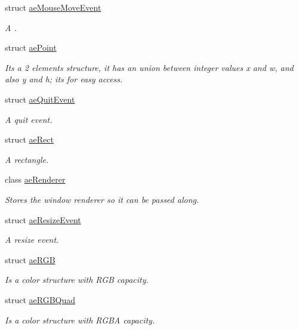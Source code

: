 \begin{DoxyCompactItemize}
struct \hyperlink{structae_core_1_1ae_mouse_move_event}{ae\+Mouse\+Move\+Event}
\begin{DoxyCompactList}\small\item\em A . \end{DoxyCompactList}\item 
struct \hyperlink{structae_core_1_1ae_point}{ae\+Point}
\begin{DoxyCompactList}\small\item\em It\textquotesingle{}s a 2 elements structure, it has an union between integer values x and w, and also y and h; it\textquotesingle{}s for easy access. \end{DoxyCompactList}\item 
struct \hyperlink{structae_core_1_1ae_quit_event}{ae\+Quit\+Event}
\begin{DoxyCompactList}\small\item\em A quit event. \end{DoxyCompactList}\item 
struct \hyperlink{structae_core_1_1ae_rect}{ae\+Rect}
\begin{DoxyCompactList}\small\item\em A rectangle. \end{DoxyCompactList}\item 
class \hyperlink{classae_core_1_1ae_renderer}{ae\+Renderer}
\begin{DoxyCompactList}\small\item\em Stores the window renderer so it can be passed along. \end{DoxyCompactList}\item 
struct \hyperlink{structae_core_1_1ae_resize_event}{ae\+Resize\+Event}
\begin{DoxyCompactList}\small\item\em A resize event. \end{DoxyCompactList}\item 
struct \hyperlink{structae_core_1_1ae_r_g_b}{ae\+R\+GB}
\begin{DoxyCompactList}\small\item\em Is a color structure with R\+GB capacity. \end{DoxyCompactList}\item 
struct \hyperlink{structae_core_1_1ae_r_g_b_quad}{ae\+R\+G\+B\+Quad}
\begin{DoxyCompactList}\small\item\em Is a color structure with R\+G\+BA capacity. \end{DoxyCompactList}\item 

\end{DoxyCompactItemize}
